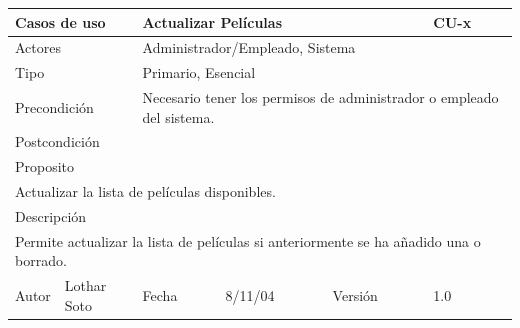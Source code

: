\documentclass{article}
\begin{document}
\begin{table}[h]
\begin{tabular}{|l|l|l|l|l|l|}
\hline
\multicolumn{2}{|p{2cm}|}{Casos de uso}  & \multicolumn{3}{p{7cm}|}{Actualizar Películas} & CU-x \\
\hline
\multicolumn{2}{|p{2cm}|}{Actores}       & \multicolumn{4}{p{8cm}|}{Administrador/Empleado, Sistema}        \\
\hline
\multicolumn{2}{|p{2cm}|}{Tipo}          & \multicolumn{4}{p{8cm}|}{Primario, Esencial}        \\
\hline
\multicolumn{2}{|p{2cm}|}{Precondición}  & \multicolumn{4}{p{8cm}|}{Necesario tener los permisos de administrador o empleado del sistema.}        \\
\hline
\multicolumn{2}{|p{2cm}|}{Postcondición} & \multicolumn{4}{p{8cm}|}{}        \\
\hline
\multicolumn{6}{|p{10cm}|}{Proposito}                                   \\
\hline
\multicolumn{6}{|p{10cm}|}{Actualizar la lista de películas disponibles.}                                            \\
\hline
\multicolumn{6}{|p{10cm}|}{Descripción}                                 \\
\hline
\multicolumn{6}{|p{10cm}|}{Permite actualizar la lista de películas si anteriormente se ha añadido una o borrado.}                                            \\
\hline
Autor          &       Lothar Soto        & Fecha    &  8/11/04   &   Versión  & 1.0\\    
\hline
\end{tabular}
\end{table}
\end{document}
